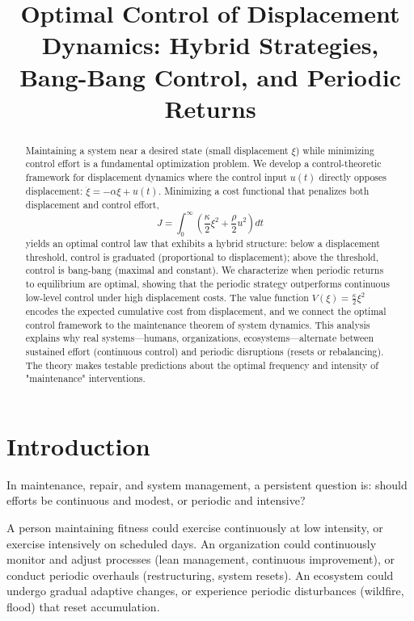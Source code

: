 \documentclass[12pt]{article}
\title{Optimal Control of Displacement Dynamics: Hybrid Strategies, Bang-Bang Control, and Periodic Returns}
\author{}
\date{}
\begin{document}
\maketitle

\begin{abstract}
Maintaining a system near a desired state (small displacement $\xi$) while minimizing control effort is a fundamental optimization problem. We develop a control-theoretic framework for displacement dynamics where the control input $u(t)$ directly opposes displacement: $\dot{\xi} = -\alpha \xi + u(t)$. Minimizing a cost functional that penalizes both displacement and control effort,
\begin{equation*}
J = \int_0^\infty \left( \frac{\kappa}{2} \xi^2 + \frac{\rho}{2} u^2 \right) dt
\end{equation*}
yields an optimal control law that exhibits a hybrid structure: below a displacement threshold, control is graduated (proportional to displacement); above the threshold, control is bang-bang (maximal and constant). We characterize when periodic returns to equilibrium are optimal, showing that the periodic strategy outperforms continuous low-level control under high displacement costs. The value function $V(\xi) = \frac{\kappa}{2} \xi^2$ encodes the expected cumulative cost from displacement, and we connect the optimal control framework to the maintenance theorem of system dynamics. This analysis explains why real systems—humans, organizations, ecosystems—alternate between sustained effort (continuous control) and periodic disruptions (resets or rebalancing). The theory makes testable predictions about the optimal frequency and intensity of "maintenance" interventions.
\end{abstract}

\section{Introduction}

In maintenance, repair, and system management, a persistent question is: should efforts be continuous and modest, or periodic and intensive?

A person maintaining fitness could exercise continuously at low intensity, or exercise intensively on scheduled days. An organization could continuously monitor and adjust processes (lean management, continuous improvement), or conduct periodic overhauls (restructuring, system resets). An ecosystem could undergo gradual adaptive changes, or experience periodic disturbances (wildfire, flood) that reset accumulation.
\end{document}
